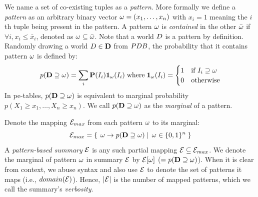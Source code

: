 We name a set of co-existing tuples as a \emph{pattern}.
More formally we define a \emph{pattern} as an arbitrary binary vector $\omega=(x_1,\ldots,x_n)$ with $x_i=1$ meaning the $i$th tuple being present in the pattern.
A pattern $\omega$ is \emph{contained} in the other $\bar{\omega}$ if $\forall i, x_i\leq \bar{x}_i$, denoted as $\omega \subseteq \bar{\omega}$.
Note that a world $D$ is a pattern by definition.
Randomly drawing a world $D\in\mathbf{D}$ from $PDB$, the probability that it contains pattern $\omega$ is defined by:
\begin{equation*}
  p(\mathbf{D} \supseteq \omega) = \sum_i\mathbf{P}(I_i)\mathbf{1}_{\omega}(I_i) \;\text{where}\;  \mathbf{1}_{\omega}(I_i)  =
    \begin{cases}
      1 & \text{if $I_i \supseteq \omega$}\\
      0 & \text{otherwise}\\
    \end{cases}       
\end{equation*}
In pe-tables, $p(\mathbf{D} \supseteq \omega)$ is equivalent to marginal probability $p(X_1\geq x_1,\ldots,X_n\geq x_n)$.
We call $p(\mathbf{D} \supseteq \omega)$ as the \emph{marginal} of a pattern.

Denote the mapping $\mathcal E_{max}$ from each pattern $\omega$ to its marginal:
$$\mathcal E_{max} = \left\{\left.\;{\omega \rightarrow p(\mathbf{D} \supseteq \omega)}\;\right|\;{\omega \in \{0,1\}^n}\;\right\}$$
A \emph{pattern-based summary} $\mathcal E$ is any such partial mapping $\mathcal E \subseteq \mathcal E_{max}$. 
We denote the marginal of pattern $\omega$ in summary $\mathcal E$ by $\mathcal E[\omega] $ ($= p(\mathbf{D} \supseteq \omega)$).
When it is clear from context, we abuse syntax and also use $\mathcal E$ to denote the set of patterns it maps (i.e., $domain(\mathcal E)$).
Hence, $|\mathcal E|$ is the number of mapped patterns, which we call the summary's \emph{verbosity}.


